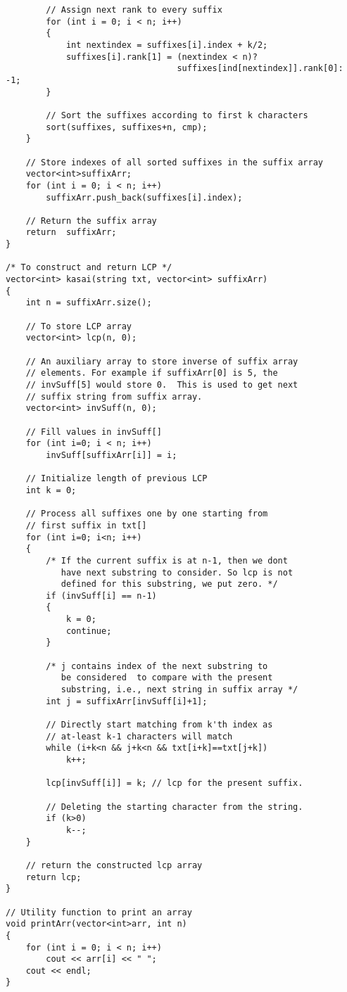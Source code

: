 \documentclass{article}
\begin{document}
\begin{lstlisting}
        // Assign next rank to every suffix
        for (int i = 0; i < n; i++)
        {
            int nextindex = suffixes[i].index + k/2;
            suffixes[i].rank[1] = (nextindex < n)?
                                  suffixes[ind[nextindex]].rank[0]: -1;
        }
 
        // Sort the suffixes according to first k characters
        sort(suffixes, suffixes+n, cmp);
    }
 
    // Store indexes of all sorted suffixes in the suffix array
    vector<int>suffixArr;
    for (int i = 0; i < n; i++)
        suffixArr.push_back(suffixes[i].index);
 
    // Return the suffix array
    return  suffixArr;
}
 
/* To construct and return LCP */
vector<int> kasai(string txt, vector<int> suffixArr)
{
    int n = suffixArr.size();
 
    // To store LCP array
    vector<int> lcp(n, 0);
 
    // An auxiliary array to store inverse of suffix array
    // elements. For example if suffixArr[0] is 5, the
    // invSuff[5] would store 0.  This is used to get next
    // suffix string from suffix array.
    vector<int> invSuff(n, 0);
 
    // Fill values in invSuff[]
    for (int i=0; i < n; i++)
        invSuff[suffixArr[i]] = i;
 
    // Initialize length of previous LCP
    int k = 0;
 
    // Process all suffixes one by one starting from
    // first suffix in txt[]
    for (int i=0; i<n; i++)
    {
        /* If the current suffix is at n-1, then we dont
           have next substring to consider. So lcp is not
           defined for this substring, we put zero. */
        if (invSuff[i] == n-1)
        {
            k = 0;
            continue;
        }
 
        /* j contains index of the next substring to
           be considered  to compare with the present
           substring, i.e., next string in suffix array */
        int j = suffixArr[invSuff[i]+1];
 
        // Directly start matching from k'th index as
        // at-least k-1 characters will match
        while (i+k<n && j+k<n && txt[i+k]==txt[j+k])
            k++;
 
        lcp[invSuff[i]] = k; // lcp for the present suffix.
 
        // Deleting the starting character from the string.
        if (k>0)
            k--;
    }
 
    // return the constructed lcp array
    return lcp;
}
 
// Utility function to print an array
void printArr(vector<int>arr, int n)
{
    for (int i = 0; i < n; i++)
        cout << arr[i] << " ";
    cout << endl;
}
\end{lstlisting}
\end{document}
